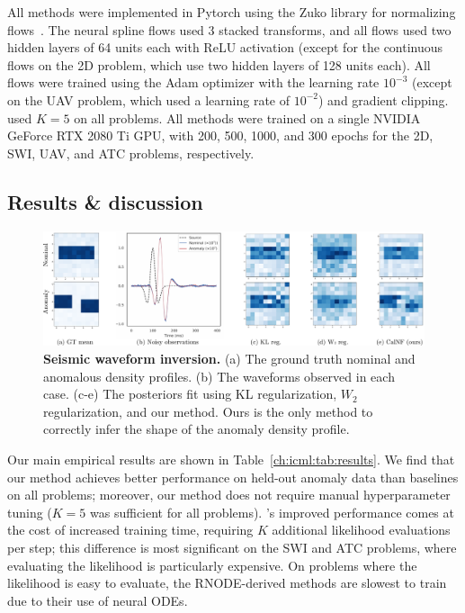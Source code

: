 All methods were implemented in Pytorch using the Zuko library for normalizing flows~\cite{ProbabilistsZuko2024}. The neural spline flows used 3 stacked transforms, and all flows used two hidden layers of 64 units each with ReLU activation (except for the continuous flows on the 2D problem, which use two hidden layers of 128 units each). All flows were trained using the Adam optimizer with the learning rate $10^{-3}$ (except on the UAV problem, which used a learning rate of $10^{-2}$) and gradient clipping. \ouralg{} used $K=5$ on all problems. All methods were trained on a single NVIDIA GeForce RTX 2080 Ti GPU, with 200, 500, 1000, and 300 epochs for the 2D, SWI, UAV, and ATC problems, respectively.

\subsection{Results \& discussion}



\begin{figure}[tb]
    \centering
    \includegraphics[width=\linewidth]{images/icml/swi_results/swi_summary.pdf}
    \caption{\textbf{Seismic waveform inversion.} (a) The ground truth nominal and anomalous density profiles. (b) The waveforms observed in each case. (c-e) The posteriors fit using KL regularization, $W_2$ regularization, and our \ouralg{} method. Ours is the only method to correctly infer the shape of the anomaly density profile.}
    \label{ch:icml:fig:swi_results}
\end{figure}

Our main empirical results are shown in Table~\ref{ch:icml:tab:results}. We find that our method achieves better performance on held-out anomaly data than baselines on all problems; moreover, our method does not require manual hyperparameter tuning ($K=5$ was sufficient for all problems). \ouralg{}'s improved performance comes at the cost of increased training time, requiring $K$ additional likelihood evaluations per step; this difference is most significant on the SWI and ATC problems, where evaluating the likelihood is particularly expensive. On problems where the likelihood is easy to evaluate, the RNODE-derived methods are slowest to train due to their use of neural ODEs.


